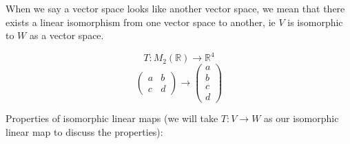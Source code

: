 \documentclass[11pt,a4paper]{colorart}
\def\l{\left}
\def\r{\right}
\def\d{{\rm d}}
\def\R{\mathbb{R}}
\def\b{\beta}
\begin{document}
\begin{remark}
	When we say a vector space looks like another vector space, we mean that there exists a linear isomorphism from one vector space to another, ie $V$ is isomorphic to $W$ as a vector space.
\end{remark}

\begin{example}
	\[ T: M_2 \l( \R \r) \rightarrow \R^4 \]
	\[ \begin{pmatrix} a & b \\ c & d \end{pmatrix} \rightarrow
	   \begin{pmatrix} a \\b \\ c \\d \end{pmatrix} \]
\end{example}

Properties of isomorphic linear maps (we will take $T:V\rightarrow W$ as our isomorphic linear map to discuss the properties):
\end{document}
